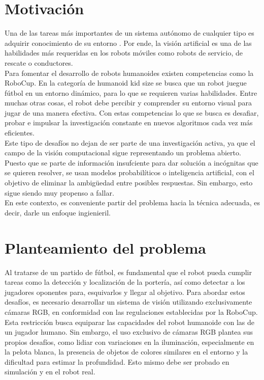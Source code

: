 \section{Motivación}
Una de las tareas más importantes de un sistema autónomo de cualquier tipo es adquirir conocimiento de su entorno\cite{siegwart2011introduction} . Por ende, la visión artificial es una de las habilidades más requeridas en los robots móviles como robots de servicio, de rescate o conductores.
\\
Para fomentar el desarrollo de robots humanoides existen competencias como la RoboCup. En la categoría de humanoid kid size se busca  que un robot juegue fútbol en un entorno dinámico, para lo que se requieren varias habilidades. Entre muchas otras cosas, el robot debe percibir y comprender su entorno visual para jugar de una manera efectiva. Con estas competencias lo que se busca es desafiar, probar e impulsar la investigación constante en nuevos algoritmos cada vez más eficientes. \cite{fiedler2019open} \\Este tipo de desafíos no dejan de ser parte de una investigación activa, ya que el campo de la visión computacional sigue representando un problema abierto. Puesto que se parte de información insufciente para dar solución a incógnitas que se quieren resolver, se usan modelos probabilíticos o inteligencia artificial, con el objetivo de eliminar la ambigüedad entre posibles respuestas. Sin embargo, esto sigue siendo muy propenso a fallar.\\ En este contexto, es conveniente partir del problema hacia la técnica adecuada, es decir, darle un enfoque ingienieril. \cite{szeliski2022computer}

\section{Planteamiento del problema}
Al tratarse de un partido de fútbol, es fundamental que el robot pueda cumplir tareas como la detección y localización de la portería, así como detectar a los jugadores oponentes para, esquivarlos y llegar al objetivo. Para abordar estos desafíos, es necesario desarrollar un sistema de visión utilizando exclusivamente cámaras RGB, en conformidad con las regulaciones establecidas por la RoboCup.\\ Esta restricción busca equiparar las capacidades del robot humanoide con las de un jugador humano. Sin embargo, el uso exclusivo de cámaras RGB plantea sus propios desafíos, como lidiar con variaciones en la iluminación, especialmente en la pelota blanca, la presencia de objetos de colores similares en el entorno y la dificultad para estimar la profundidad. Esto mismo debe ser probado en simulación y en el robot real.


